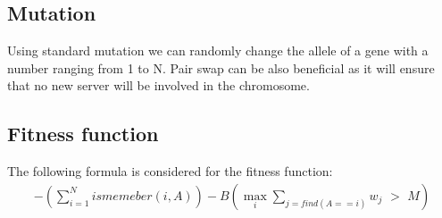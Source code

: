 \documentclass[]{article}
\begin{document}
	 \subsection*{Mutation}
	 Using standard mutation we can randomly change the allele of a gene with a number ranging from 1 to N. Pair swap can be also beneficial as it will ensure that no new server will be involved in the chromosome.
	 
	 \subsection*{Fitness function}
	 The following formula is considered for the fitness function:
	 \begin{align*}
	 	- \left(\sum_{i=1}^{N} ismemeber(i, A)\right) - B \left(\max_i \sum_{j=find(A==i)} w_j \,\, > \,\, M\right)
	 \end{align*}
	
\end{document}
